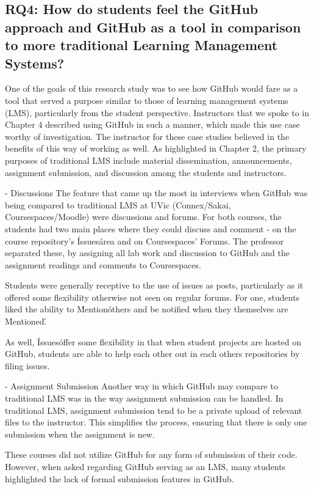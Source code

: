 \subsection{RQ4: How do students feel the GitHub approach and GitHub as a tool in comparison to more traditional Learning Management Systems?}
One of the goals of this research study was to see how GitHub would fare as a tool that served a purpose similar to those of learning management systems (LMS), particularly from the student perspective. Instructors that we spoke to in Chapter 4 described using GitHub in such a manner, which made this use case worthy of investigation. The instructor for these case studies believed in the benefits of this way of working as well. As highlighted in Chapter 2, the primary purposes of traditional LMS include material dissemination, announcements, assignment submission, and discussion among the students and instructors.

- Discussions
The feature that came up the most in interviews when GitHub was being compared to traditional LMS at UVic (Connex/Sakai, Coursespaces/Moodle) were discussions and forums. For both courses, the students had two main places where they could discuss and comment - on the course repository's \'Issues\' area and on Coursespaces' Forums. The professor separated these, by assigning all lab work and discussion to GitHub and the assignment readings and comments to Coursespaces.

Students were generally receptive to the use of issues as posts, particularly as it offered some flexibility otherwise not seen on regular forums. For one, students liked the ability to \'Mention\' others and be notified when they themselves are \'Mentioned\'. %

As well, \'Issues\' offer some flexibility in that when student projects are hosted on GitHub, students are able to help each other out in each others repositories by filing issues. %

- Assignment Submission
Another way in which GitHub may compare to traditional LMS was in the way assignment submission can be handled. In traditional LMS, assignment submission tend to be a private upload of relevant files to the instructor. This simplifies the process, ensuring that there is only one submission when the assignment is new.

These courses did not utilize GitHub for any form of submission of their code. However, when asked regarding GitHub serving as an LMS, many students highlighted the lack of formal submission features in GitHub. %

